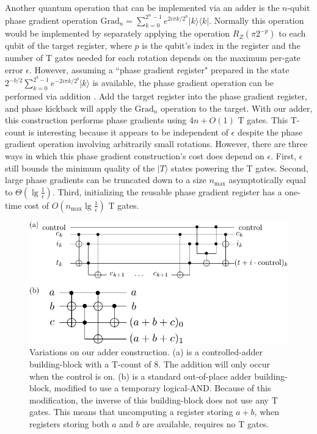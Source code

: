 \documentclass[twocolumn,accepted=2018-05-25]{quantumarticle}
\begin{document}
Another quantum operation that can be implemented via an adder is the $n$-qubit phase gradient operation $\text{Grad}_n = \sum_{k=0}^{2^n-1} e^{2 i \pi k / 2^n} |k\rangle \langle k|$.
Normally this operation would be implemented by separately applying the operation $R_Z(\pi 2^{-p})$ to each qubit of the target register, where $p$ is the qubit's index in the register and the number of T gates needed for each rotation depends on the maximum per-gate error $\epsilon$.
However, assuming a ``phase gradient register" prepared in the state $2^{-b/2} \sum_{k=0}^{2^b-1} e^{-2 i \pi k / 2^b} |k\rangle$ is available, the phase gradient operation can be performed via addition \cite{Kitaev2002}.
Add the target register into the phase gradient register, and phase kickback will apply the $\text{Grad}_n$ operation to the target.
With our adder, this construction performs phase gradients using $4n + O(1)$ T gates.
This T-count is interesting because it appears to be independent of $\epsilon$ despite the phase gradient operation involving arbitrarily small rotations.
However, there are three ways in which this phase gradient construction's cost does depend on $\epsilon$.
First, $\epsilon$ still bounds the minimum quality of the $|T\rangle$ states powering the T gates.
Second, large phase gradients can be truncated down to a size $n_{\text{max}}$ asymptotically equal to $\Theta(\lg \frac{1}{\epsilon})$.
Third, initializing the reusable phase gradient register has a one-time cost of $O(n_{\text{max}} \lg \frac{1}{\epsilon})$ T gates.

\begin{figure}
  \includegraphics[width=\linewidth]{other-adder-building-blocks.pdf}
  \caption{
	Variations on our adder construction.
	(a) is a controlled-adder building-block with a T-count of 8.
	The addition will only occur when the control is on.
	(b) is a standard out-of-place adder building-block, modified to use a temporary logical-AND.
	Because of this modification, the inverse of this building-block does not use any T gates.
	This means that uncomputing a register storing $a+b$, when registers storing both $a$ and $b$ are available, requires no T gates.
  }
  \label{fig:other-adder-building-blocks}
\end{figure}
\end{document}
